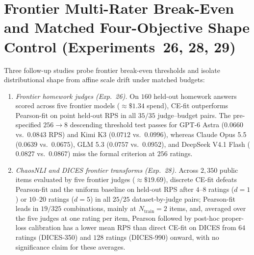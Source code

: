 \section{Frontier Multi-Rater Break-Even and Matched Four-Objective Shape Control (Experiments~26, 28, 29)}
\label{sec:supp-exp29}

Three follow-up studies probe frontier break-even thresholds and isolate distributional shape from affine scale drift under matched budgets:
\begin{enumerate}
    \item \emph{Frontier homework judges (Exp.~26).} On $160$ held-out homework answers scored across five frontier models ($\approx\$1.34$ spend), CE-fit outperforms Pearson-fit on point held-out RPS in all $35/35$ judge--budget pairs. The pre-specified $256\to 8$ descending threshold test passes for GPT-6 Astra ($0.0660$ vs.\ $0.0843$ RPS) and Kimi K3 ($0.0712$ vs.\ $0.0996$), whereas Claude Opus 5.5 ($0.0639$ vs.\ $0.0675$), GLM 5.3 ($0.0757$ vs.\ $0.0952$), and DeepSeek V4.1 Flash ($0.0827$ vs.\ $0.0867$) miss the formal criterion at $256$ ratings.
    \item \emph{ChaosNLI and DICES frontier transforms (Exp.~28).} Across $2{,}350$ public items evaluated by five frontier judges ($\approx\$19.69$), discrete CE-fit defeats Pearson-fit and the uniform baseline on held-out RPS after $4$--$8$ ratings ($d=1$) or $10$--$20$ ratings ($d=5$) in all $25/25$ dataset-by-judge pairs; Pearson-fit leads in $19/325$ combinations, mainly at $N_{\text{train}}=2$ items, and, averaged over the five judges at one rating per item, Pearson followed by post-hoc proper-loss calibration has a lower mean RPS than direct CE-fit on DICES from $64$ ratings (DICES-350) and $128$ ratings (DICES-990) onward, with no significance claim for these averages.

\end{enumerate}
